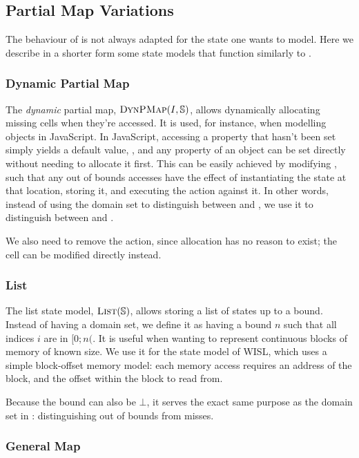 \subsection{Partial Map Variations}

The behaviour of \PMap{} is not always adapted for the state one wants to model. Here we describe in a shorter form some state models that function similarly to \PMap.

\subsubsection{Dynamic Partial Map}

The \emph{dynamic} partial map, $\textsc{DynPMap}(I,\mathbb S)$, allows dynamically allocating missing cells when they're accessed. It is used, for instance, when modelling objects in JavaScript. In JavaScript, accessing a property that hasn't been set simply yields a default value, , and any property of an object can be set directly without needing to allocate it first. This can be easily achieved by modifying \PMap, such that any out of bounds accesses have the effect of instantiating the state at that location, storing it, and executing the action against it. In other words, instead of using the domain set to distinguish between \Err{} and \Miss, we use it to distinguish between \Ok{} and \Miss{} \cite{sacha-phd}.

We also need to remove the \alloc{} action, since allocation has no reason to exist; the cell can be modified directly instead.

\subsubsection{List}

The list state model, $\textsc{List}(\mathbb S)$, allows storing a list of states up to a bound. Instead of having a domain set, we define it as having a bound $n$ such that all indices $i$ are in $[0;n($. It is useful when wanting to represent continuous blocks of memory of known size. We use it for the state model of WISL, which uses a simple block-offset memory model: each memory access requires an address of the block, and the offset within the block to read from.

Because the bound can also be $\bot$, it serves the exact same purpose as the domain set in \PMap{}: distinguishing out of bounds from misses.

\subsubsection{General Map}

